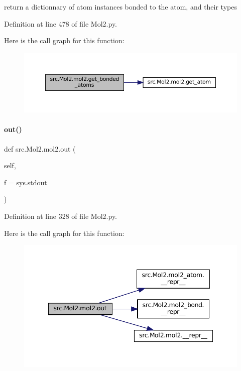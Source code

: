 return a dictionnary of atom instances bonded to the atom, and their types 



Definition at line 478 of file Mol2.\+py.

Here is the call graph for this function\+:
\nopagebreak
\begin{figure}[H]
\begin{center}
\leavevmode
\includegraphics[width=350pt]{classsrc_1_1Mol2_1_1mol2_a85de5060effdb6a854a5cad7f511bf30_cgraph}
\end{center}
\end{figure}
\mbox{\label{classsrc_1_1Mol2_1_1mol2_ad137b57786b1b387bfa868e096f501f2}} 
\paragraph{\texorpdfstring{out()}{out()}}
{\footnotesize\ttfamily def src.\+Mol2.\+mol2.\+out (\begin{DoxyParamCaption}\item[{}]{self,  }\item[{}]{f = {\ttfamily sys.stdout} }\end{DoxyParamCaption})}



Definition at line 328 of file Mol2.\+py.

Here is the call graph for this function\+:
\nopagebreak
\begin{figure}[H]
\begin{center}
\leavevmode
\includegraphics[width=348pt]{classsrc_1_1Mol2_1_1mol2_ad137b57786b1b387bfa868e096f501f2_cgraph}
\end{center}
\end{figure}
\mbox{\label{classsrc_1_1Mol2_1_1mol2_a3f8091dc58267dfc193486b80c247def}} 
